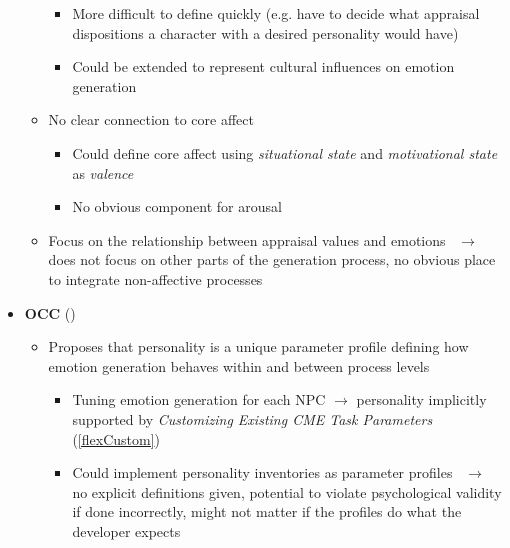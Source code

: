 \begin{itemize}
\begin{itemize}
\begin{itemize}
            \item More difficult to define quickly (e.g. have to decide what
            appraisal dispositions a character with a desired personality would
            have)

            \item Could be extended to represent cultural influences on emotion
            generation
        \end{itemize}

        \item No clear connection to core affect
        \begin{itemize}
            \item Could define core affect using \textit{situational state} and
            \textit{motivational state} as \textit{valence}

            \item No obvious component for arousal
        \end{itemize}

        \item Focus on the relationship between appraisal values and
        emotions~\citep[p.~81]{roseman2001model} $\rightarrow$ does not focus
        on other parts of the generation process, no obvious place to integrate
        non-affective processes
    \end{itemize}

    \item \textbf{OCC} (\strong)
    \begin{itemize}
        \item Proposes that personality is a unique parameter profile defining
        how emotion generation behaves within and between process
        levels~\citep[p.~189--190]{ortony2005affect}
        \begin{itemize}
            \item Tuning emotion generation for each NPC $\rightarrow$
            personality implicitly supported by \textit{Customizing Existing
                CME Task Parameters} (\ref{flexCustom})

            \item Could implement personality inventories as parameter
            profiles~\citep[p.~191--192]{ortony2005affect} $\rightarrow$ no
            explicit definitions given, potential to violate psychological
            validity if done incorrectly, might not matter if the profiles do
            what the developer expects
        \end{itemize}


\end{itemize}
\end{itemize}
